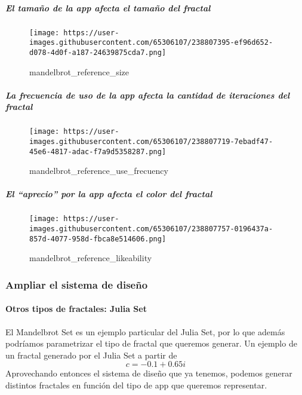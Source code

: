 \documentclass[
]{article}
\begin{document}
\hypertarget{el-tamauxf1o-de-la-app-afecta-el-tamauxf1o-del-fractal}{%
\subparagraph{El tamaño de la app afecta el tamaño del
fractal}\label{el-tamauxf1o-de-la-app-afecta-el-tamauxf1o-del-fractal}}

\begin{figure}
\centering
\texttt{[image: https://user-images.githubusercontent.com/65306107/238807395-ef96d652-d078-4d0f-a187-24639875cda7.png]}
\caption{mandelbrot\_reference\_size}
\end{figure}

\hypertarget{la-frecuencia-de-uso-de-la-app-afecta-la-cantidad-de-iteraciones-del-fractal}{%
\subparagraph{La frecuencia de uso de la app afecta la cantidad de
iteraciones del
fractal}\label{la-frecuencia-de-uso-de-la-app-afecta-la-cantidad-de-iteraciones-del-fractal}}

\begin{figure}
\centering
\texttt{[image: https://user-images.githubusercontent.com/65306107/238807719-7ebadf47-45e6-4817-adac-f7a9d5358287.png]}
\caption{mandelbrot\_reference\_use\_frecuency}
\end{figure}

\hypertarget{el-aprecio-por-la-app-afecta-el-color-del-fractal}{%
\subparagraph{El ``aprecio'' por la app afecta el color del
fractal}\label{el-aprecio-por-la-app-afecta-el-color-del-fractal}}

\begin{figure}
\centering
\texttt{[image: https://user-images.githubusercontent.com/65306107/238807757-0196437a-857d-4077-958d-fbca8e514606.png]}
\caption{mandelbrot\_reference\_likeability}
\end{figure}

\hypertarget{ampliar-el-sistema-de-diseuxf1o}{%
\subsubsection{Ampliar el sistema de
diseño}\label{ampliar-el-sistema-de-diseuxf1o}}

\hypertarget{otros-tipos-de-fractales-julia-set}{%
\paragraph{Otros tipos de fractales: Julia
Set}\label{otros-tipos-de-fractales-julia-set}}

El Mandelbrot Set es un ejemplo particular del Julia Set, por lo que
además podríamos parametrizar el tipo de fractal que queremos generar.
Un ejemplo de un fractal generado por el Julia Set a partir de
\[c = -0.1 + 0.65i\] Aprovechando entonces el sistema de diseño que ya
tenemos, podemos generar distintos fractales en función del tipo de app
que queremos representar.
\end{document}
